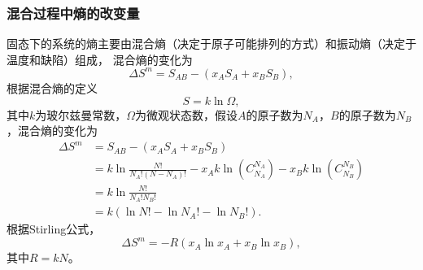                 \subsubsection{混合过程中熵的改变量}
                    固态下的系统的熵主要由混合熵（决定于原子可能排列的方式）和振动熵（决定于温度和缺陷）组成，
                    混合熵的变化为
                    \begin{equation}
                        \Delta S^m=S_{AB}-(x_AS_A+x_BS_B),
                    \end{equation}
                    根据混合熵的定义
                    \begin{equation}
                        S=k\ln{\Omega},
                    \end{equation}
                    其中$k$为玻尔兹曼常数，$\Omega$为微观状态数，假设$A$的原子数为$N_A$，$B$的原子数为$N_B$，混合熵的变化为
                    \begin{equation}
                        \begin{split}
                        \Delta S^m&=S_{AB}-(x_AS_A+x_BS_B)\\
                        &=k\ln{\frac{N!}{N_A!(N-N_A)!}}-x_Ak \ln \left(C_{N_{A}}^{N_{A}}\right)  -x_Bk \ln \left(C_{N_{B}}^{N_{B}}\right)\\
                        &=k\ln{\frac{N!}{N_A!N_B!}}\\
                        &=k\left( \ln{N!}-\ln{N_A!}-\ln{N_B!} \right).                
                        \end{split}                                      
                    \end{equation}
                    根据Stirling公式，
                    \begin{equation}
                        \Delta S^m=-R(x_A\ln{x_A}+x_B\ln{x_B}),
                    \end{equation}
                    其中$R=kN$。
